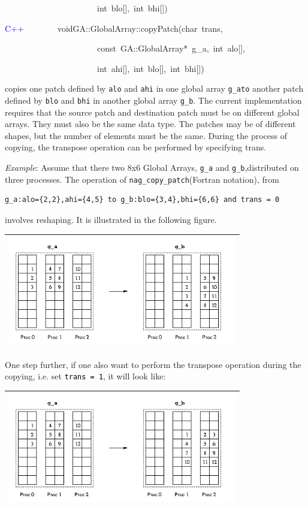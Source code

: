 ~~~~~~~~~~~~~~~~~~~~~~int~blo{[}{]},~int~bhi{[}{]})~

\textcolor{blue}{C++}~~~~~~~~voidGA::GlobalArray::copyPatch(char~trans,~

~~~~~~~~~~~~~~~~~~~~~~const~GA::GlobalArray{*}~g\_a,~int~alo{[}{]},~

~~~~~~~~~~~~~~~~~~~~~~int~ahi{[}{]},~int~blo{[}{]},~int~bhi{[}{]})

copies one patch defined by \texttt{alo} and \texttt{ahi} in one global
array \texttt{g\_ato} another patch defined by \texttt{blo} and \texttt{bhi}
in another global array \texttt{g\_b}. The current implementation
requires that the source patch and destination patch must be on different
global arrays. They must also be the same data type. The patches may
be of different shapes, but the number of elements must be the same.
During the process of copying, the transpose operation can be performed
by specifying trans.

\emph{Example}: Assume that there two 8x6 Global Arrays, \texttt{g\_a}
and \texttt{g\_b},distributed on three processes. The operation of
\texttt{nag\_copy\_patch}(Fortran notation), from
\begin{verbatim}
g_a:alo={2,2},ahi={4,5} to g_b:blo={3,4},bhi={6,6} and trans = 0
\end{verbatim}
involves reshaping. It is illustrated in the following figure. 

\begin{tabular}{|c|}
\hline 
\includegraphics[width=10cm]{copy1}\tabularnewline
\hline
\end{tabular}

One step further, if one also want to perform the transpose operation
during the copying, i.e. set \texttt{\textcolor{black}{trans = 1}},
it will look like: 

\begin{tabular}{|c|}
\hline 
\includegraphics[width=10cm]{copy2}\tabularnewline
\hline
\end{tabular}

